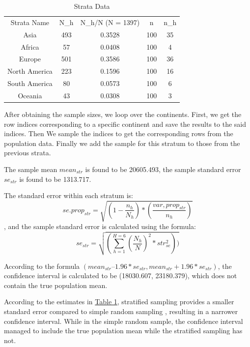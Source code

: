\documentclass{article}
\begin{document}
\begin{table}[h]
    \begin{center}
    \caption{Strata Data}
    \begin{tabular}{c c c c c }
Strata Name & N_h & N_h/N (N = 1397) & n & n_h \\
Asia & 493 & 0.3528 & 100 & 35 \\
Africa & 57 & 0.0408 & 100 & 4 \\
Europe & 501 & 0.3586 & 100 & 36 \\
North America & 223 & 0.1596 & 100 & 16 \\
South America & 80 & 0.0573 & 100 & 6 \\
Oceania & 43 & 0.0308 & 100 & 3
    \end{tabular}
    \label{tab:(c)}
    \end{center}
    \end{table}

After obtaining the sample sizes, we loop over the continents. First, we get the row indices corresponding to a specific continent and save the results to the said indices. Then We sample the indices to get the corresponding rows from the population data. Finally we add the sample for this stratum to those from the previous strata.

The sample mean $mean_{str}$ is found to be 20605.493, the sample standard error $se_{str}$ is found to be 1313.717. 

The standard error within each stratum is: \\
$$se.prop_{str} = \sqrt{(1-\frac{n_h}{N_h}) * (\frac{var,prop_{str}}{n_h})}$$, and the sample standard error is calculated using the formula:\\
$$se_{str} = \sqrt{(\sum_{h=1}^{H = 6}(\frac{N_h}{N})^2*str_{se}^2))}$$ 

According to the formula $(mean_{str} – 1.96*se_{str}, mean_{str} + 1.96*se_{str})$, the confidence interval is calculated to be (18030.607, 23180.379), which does not contain the true population mean. \\


According to the estimates in {\hyperref[tab:(a)]{Table 1}}, stratified sampling provides a smaller standard error compared to simple random sampling , resulting in a narrower confidence interval. While in the simple random sample, the confidence interval managed to include the true population mean while the stratified sampling has not.\\
\end{document}
